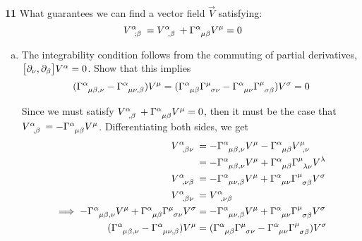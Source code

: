 \documentclass[gr-notes.tex]{subfiles}
\begin{document}
\textbf{11}
What guarantees we can find a vector field $\vec{V}$ satisfying:
%
\begin{displaymath}
  \tensor{V}{^\alpha_{;\beta}} =
  \tensor{V}{^\alpha_{,\beta}} +
  \tensor{\Gamma}{^\alpha_{\mu\beta}}
  V^\mu =
  0
\end{displaymath}
%
\begin{enumerate}[(a)]
\item The integrability condition follows from the commuting of partial derivatives, $\comm{\partial_\nu}{\partial_\beta} V^\alpha = 0$. Show that this implies
%
\begin{displaymath}
  (\tensor{\Gamma}{^\alpha_{\mu\beta,\nu}} -
   \tensor{\Gamma}{^\alpha_{\mu\nu,\beta}}) V^\mu =
  (\tensor{\Gamma}{^\alpha_{\mu\beta}} \tensor{\Gamma}{^\mu_{\sigma\nu}} -
   \tensor{\Gamma}{^\alpha_{\mu\nu}} \tensor{\Gamma}{^\mu_{\sigma\beta}})
  V^\sigma =
  0
\end{displaymath}

Since we must satisfy $\tensor{V}{^\alpha_{,\beta}} + \tensor{\Gamma}{^\alpha_{\mu\beta}} V^\mu = 0$, then it must be the case that $\tensor{V}{^\alpha_{,\beta}} = -\tensor{\Gamma}{^\alpha_{\mu\beta}} V^\mu$. Differentiating both sides, we get
%
\begin{align*}
  \tensor{V}{^\alpha_{,\beta\nu}} &=
  -\tensor{\Gamma}{^\alpha_{\mu\beta,\nu}} V^\mu -
   \tensor{\Gamma}{^\alpha_{\mu\beta}} \tensor{V}{^\mu_{,\nu}}
  \\ &=
  -\tensor{\Gamma}{^\alpha_{\mu\beta,\nu}} V^\mu +
   \tensor{\Gamma}{^\alpha_{\mu\beta}}
   \tensor{\Gamma}{^\mu_{\lambda\nu}} V^\lambda
  \\
  \tensor{V}{^\alpha_{,\nu\beta}} &=
  -\tensor{\Gamma}{^\alpha_{\mu\nu,\beta}} V^\mu +
   \tensor{\Gamma}{^\alpha_{\mu\nu}}
   \tensor{\Gamma}{^\mu_{\sigma\beta}} V^\sigma
  \\
  \tensor{V}{^\alpha_{,\beta\nu}} &=
  \tensor{V}{^\alpha_{,\nu\beta}}
  \\ \implies
  -\tensor{\Gamma}{^\alpha_{\mu\beta,\nu}} V^\mu +
   \tensor{\Gamma}{^\alpha_{\mu\beta}}
   \tensor{\Gamma}{^\mu_{\sigma\nu}} V^\sigma &=
  -\tensor{\Gamma}{^\alpha_{\mu\nu,\beta}} V^\mu +
   \tensor{\Gamma}{^\alpha_{\mu\nu}}
   \tensor{\Gamma}{^\mu_{\sigma\beta}} V^\sigma
  \\
  (\tensor{\Gamma}{^\alpha_{\mu\beta,\nu}} -
   \tensor{\Gamma}{^\alpha_{\mu\nu,\beta}})
  V^\mu &=
  (\tensor{\Gamma}{^\alpha_{\mu\beta}} \tensor{\Gamma}{^\mu_{\sigma\nu}} -
   \tensor{\Gamma}{^\alpha_{\mu\nu}} \tensor{\Gamma}{^\mu_{\sigma\beta}})
  V^\sigma
\end{align*}


\end{enumerate}
\end{document}
